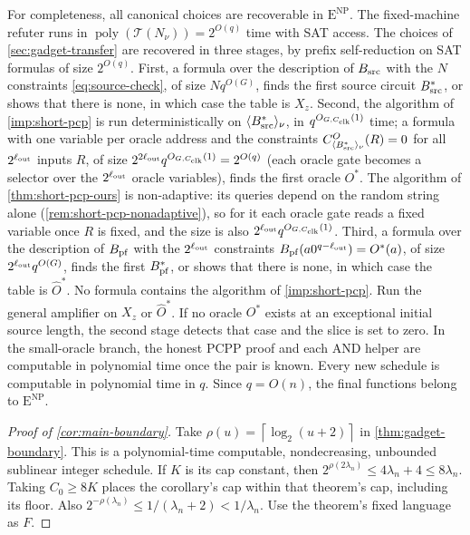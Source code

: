 \documentclass[11pt,letterpaper]{article}
\theoremstyle{definition}
\theoremstyle{remark}
\newcommand{\ENP}{\mathrm{E}^{\mathrm{NP}}}
\newcommand{\ceil}[1]{\left\lceil #1\right\rceil}
\newcommand{\lgx}{\log_2}
\newcommand{\Tclk}{\mathcal T}
\begin{document}
For completeness, all canonical choices are recoverable in $\ENP$.
The fixed-machine refuter runs in $\operatorname{poly}(\Tclk(N_\nu))
=2^{O(q)}$ time with SAT access. The choices of
\cref{sec:gadget-transfer} are recovered in three stages, by prefix
self-reduction on SAT formulas of size $2^{O(q)}$. First, a formula over
the description of $B_{\rm src}$ with the $N$ constraints
\eqref{eq:source-check}, of size $Nq^{O(G)}$, finds the first source
circuit $B^*_{\rm src}$, or shows that there is none, in which case the
table is $X_z$. Second, the algorithm of \cref{imp:short-pcp} is run
deterministically on $\langle B^*_{\rm src}\rangle_\nu$, in
$q^{O_{G,C_{\rm clk}}(1)}$ time; a formula with one variable per oracle address and the
constraints $C^O_{\langle B^*_{\rm src}\rangle_\nu}(R)=0$ for all
$2^{\ell_{\rm out}}$ inputs $R$, of size
$2^{2\ell_{\rm out}}q^{O_{G,C_{\rm clk}}(1)}=2^{O(q)}$ (each oracle gate
becomes a selector over the $2^{\ell_{\rm out}}$ oracle variables),
finds the first oracle $O^*$. The algorithm of
\cref{thm:short-pcp-ours} is non-adaptive: its queries depend on the
random string alone (\cref{rem:short-pcp-nonadaptive}), so for it each oracle gate reads a fixed
variable once $R$ is fixed, and the size is also
$2^{\ell_{\rm out}}q^{O_{G,C_{\rm clk}}(1)}$. Third, a formula over the description of
$B_{\rm pf}$ with the $2^{\ell_{\rm out}}$ constraints
$B_{\rm pf}(a0^{q-\ell_{\rm out}})=O^*(a)$, of size
$2^{\ell_{\rm out}}q^{O(G)}$, finds the first $B^*_{\rm pf}$, or shows
that there is none, in which case the table is $\widehat O^*$. No formula
contains the algorithm of \cref{imp:short-pcp}. Run the general amplifier
on $X_z$ or $\widehat O^*$. If no oracle $O^*$ exists at an exceptional
initial source length, the second stage detects that case and the slice
is set to zero. In the
small-oracle branch, the honest PCPP proof and each AND helper are
computable in polynomial time once the pair is known. Every new
schedule is computable in polynomial time in $q$. Since $q=O(n)$,
the final functions belong to $\ENP$.

\begin{proof}[Proof of \cref{cor:main-boundary}]
Take \(\rho(u)=\ceil{\lgx(u+2)}\) in
\cref{thm:gadget-boundary}. This is a polynomial-time computable,
nondecreasing, unbounded sublinear integer schedule. If \(K\)
is its cap constant, then
\(2^{\rho(2\lambda_n)}\le4\lambda_n+4\le8\lambda_n\).
Taking \(C_0\ge8K\) places the corollary's cap within that theorem's
cap, including its floor. Also
\(2^{-\rho(\lambda_n)}\le1/(\lambda_n+2)<1/\lambda_n\).
Use the theorem's fixed language as \(F\).
\end{proof}
\end{document}
